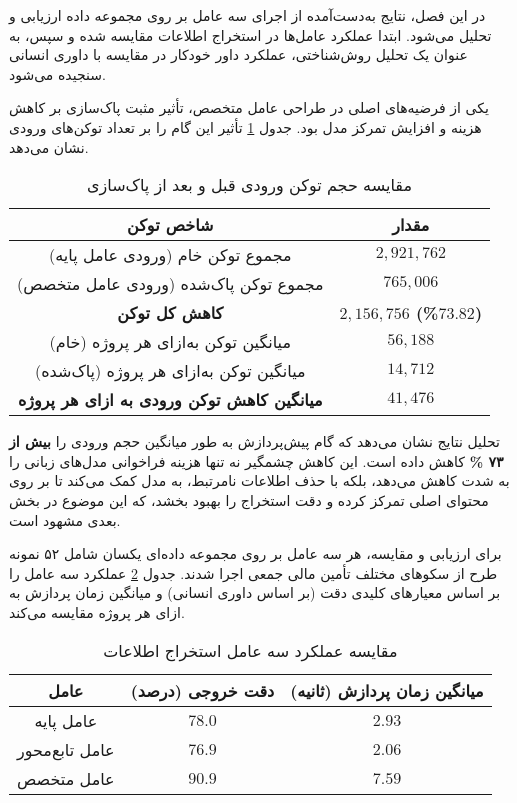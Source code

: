 

در این فصل، نتایج به‌دست‌آمده از اجرای سه عامل بر روی مجموعه داده ارزیابی و تحلیل می‌شود. ابتدا عملکرد عامل‌ها در استخراج اطلاعات مقایسه شده و سپس، به عنوان یک تحلیل روش‌شناختی، عملکرد داور خودکار در مقایسه با داوری انسانی سنجیده می‌شود.


یکی از فرضیه‌های اصلی در طراحی عامل متخصص، تأثیر مثبت پاک‌سازی  بر کاهش هزینه و افزایش تمرکز مدل بود. جدول \ref{tab:token_reduction} تأثیر این گام را بر تعداد توکن‌های ورودی نشان می‌دهد.

\begin{table}[h!]
\centering
\caption{مقایسه حجم توکن ورودی قبل و بعد از پاک‌سازی }
\label{tab:token_reduction}
\begin{tabular}{|c|c|}
\hline
\textbf{شاخص توکن} & \textbf{مقدار} \\
\hline
مجموع توکن خام (ورودی عامل پایه) & $2,921,762$ \\
مجموع توکن پاک‌شده (ورودی عامل متخصص) & $765,006$ \\
\hline
\textbf{کاهش کل توکن} & \textbf{$2,156,756$ (\%$73.82$)} \\
\hline
میانگین توکن به‌ازای هر پروژه (خام) & $56,188$ \\
میانگین توکن به‌ازای هر پروژه (پاک‌شده) & $14,712$ \\
\hline
\textbf{میانگین کاهش توکن ورودی به ازای هر پروژه} & \textbf{$41,476$} \\
\hline
\end{tabular}
\end{table}

\noindent
تحلیل نتایج نشان می‌دهد که گام پیش‌پردازش به طور میانگین حجم ورودی را \textbf{بیش از ۷۳ \%} کاهش داده است. این کاهش چشمگیر نه تنها هزینه فراخوانی مدل‌های زبانی را به شدت کاهش می‌دهد، بلکه با حذف اطلاعات نامرتبط، به مدل کمک می‌کند تا بر روی محتوای اصلی تمرکز کرده و دقت استخراج را بهبود بخشد، که این موضوع در بخش بعدی مشهود است.

برای ارزیابی و مقایسه، هر سه عامل بر روی مجموعه داده‌ای یکسان شامل ۵۲ نمونه طرح از سکوهای مختلف تأمین مالی جمعی اجرا شدند. جدول \ref{tab:agent_performance} عملکرد سه عامل را بر اساس معیارهای کلیدی دقت (بر اساس داوری انسانی) و میانگین زمان پردازش به ازای هر پروژه مقایسه می‌کند.

\begin{table}[h!]
\centering
\caption{مقایسه عملکرد سه عامل استخراج اطلاعات}
\label{tab:agent_performance}
\begin{tabular}{|c|c|c|}
\hline
\textbf{عامل} & \textbf{دقت خروجی (درصد)} & \textbf{میانگین زمان پردازش (ثانیه)} \\
\hline
عامل پایه & $78.0$ & $2.93$ \\
\hline
عامل تابع‌محور & $76.9$ & $2.06$ \\
\hline
عامل متخصص & \textbf{$90.9$} & $7.59$ \\
\hline
\end{tabular}
\end{table}

